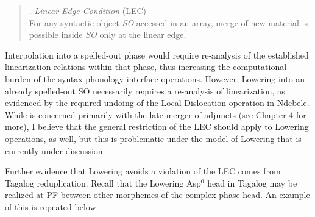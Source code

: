 \singlespacing
\begin{quote}
\ex. {\it Linear Edge Condition} (LEC) \citep{nissenbaum2000} \label{LEC} \\
For any syntactic object {\it SO} accessed in an array, merge of new material is possible inside {\it SO} only at the linear edge.

\end{quote}
\onehalfspacing
Interpolation into a spelled-out phase would require re-analysis of the established linearization relations within that phase, thus increasing the computational burden of the syntax-phonology interface operations. However, Lowering into an already spelled-out SO necessarily requires a re-analysis of linearization, as evidenced by the required undoing of the Local Dislocation operation in Ndebele. While \citet{nissenbaum2000} is concerned primarily with the late merger of adjuncts (see Chapter 4 for more), I believe that the general restriction of the LEC should apply to Lowering operations, as well, but this is problematic under the model of Lowering that is currently under discussion.

Further evidence that Lowering avoids a violation of the LEC comes from Tagalog reduplication. Recall that the Lowering Asp$^{0}$ head in Tagalog may be realized at PF between other morphemes of the complex phase head. An example of this is repeated below.


